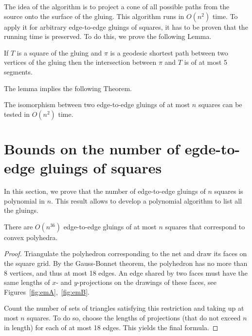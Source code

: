 \documentclass[a4paper,USenglish,cleveref, autoref, thm-restate]{socg-lipics-v2019}
\begin{document}
The idea of the algorithm is to project a cone of all possible paths from the source onto the surface of the gluing. This algorithm runs in $O(n^2)$ time. To apply it for arbitrary edge-to-edge gluings of squares, it has to be proven that the running time is preserved. To do this, we prove the following Lemma.

\begin{lemma} \label{lm:shortestSquare}
	If $T$ is a square of the gluing and $\pi$ is a geodesic shortest path between two vertices of the gluing then the intersection between $\pi$ and $T$ is of at most 5 segments.
\end{lemma}

The lemma implies the following Theorem.

\begin{theorem} \label{thm:chruntime}
	The isomorphism between two edge-to-edge gluings of at most $n$ squares can be tested in $O(n^2)$ time.
\end{theorem}

\section{Bounds on the number of egde-to-edge gluings of squares}

In this section, we prove that the number of edge-to-edge gluings of $n$ squares is polynomial in $n$. This result allows to develop a polynomial algorithm to list all the gluings.

\begin{theorem} \label{thm:n36}
	There are $O \left( n^{36} \right)$ edge-to-edge gluings of at most $n$ squares that correspond to convex polyhedra.
\end{theorem}

\begin{proof}
	Triangulate the polyhedron corresponding to the net and draw its faces on the square grid. By the Gauss-Bonnet theorem, the polyhedron has no more than 8 vertices, and thus at most 18 edges. An edge shared by two faces must have the same lengths of $x$- and $y$-projections on the drawings of these faces, see Figures~\ref{fig:emA},~\ref{fig:emB}.

	Count the number of sets of triangles satisfying this restriction and taking up at most $n$ squares. To do so, choose the lengths of projections (that do not exceed $n$ in length) for each of at most 18 edges. This yields the final formula.
\end{proof}
\end{document}
